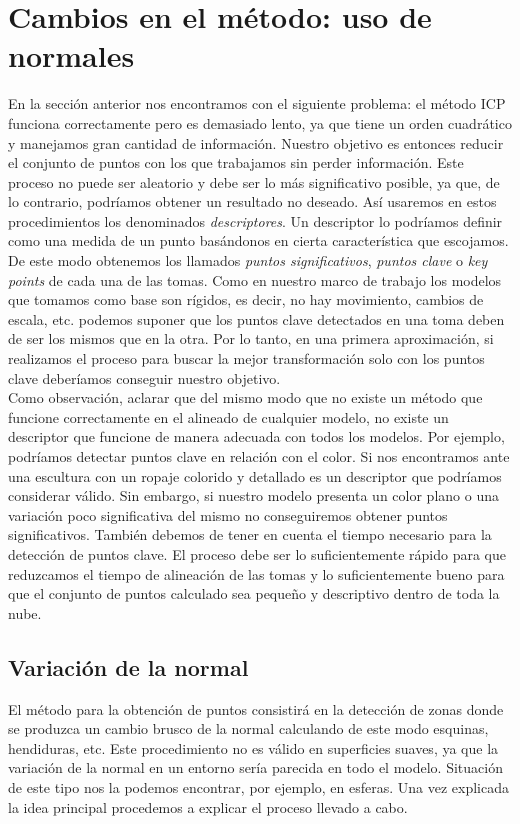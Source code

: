 \chapter{Cambios en el método: uso de normales}
En la sección anterior nos encontramos con el siguiente problema: el método ICP funciona correctamente pero es demasiado lento, ya que tiene un orden cuadrático y manejamos gran cantidad de información. Nuestro objetivo es entonces reducir el conjunto de puntos con los que trabajamos sin perder información. Este proceso no puede ser aleatorio y debe ser lo más significativo posible, ya que, de lo contrario, podríamos obtener un resultado no deseado. Así usaremos en estos procedimientos los denominados \textit{descriptores}. Un descriptor lo podríamos definir como una medida de un punto basándonos en cierta característica que escojamos. De este modo obtenemos los llamados \textit{puntos significativos}, \textit{puntos clave} o \textit{key points} de cada una de las tomas. Como en nuestro marco de trabajo los modelos que tomamos como base son rígidos, es decir, no hay movimiento, cambios de escala, etc. podemos suponer que los puntos clave detectados en una toma deben de ser los mismos que en la otra. Por lo tanto, en una primera aproximación,  si realizamos el proceso para buscar la mejor transformación solo con los puntos clave deberíamos conseguir nuestro objetivo. \\

Como observación, aclarar que del mismo modo que no existe un método que funcione correctamente en el alineado de cualquier modelo, no existe un descriptor que funcione de manera adecuada con todos los modelos. Por ejemplo, podríamos detectar puntos clave en relación con el color. Si nos encontramos ante una escultura con un ropaje colorido y detallado es un descriptor que podríamos considerar válido. Sin embargo, si nuestro modelo presenta un color plano o una variación poco significativa del mismo no conseguiremos obtener puntos significativos. También debemos de tener en cuenta el tiempo necesario para la detección de puntos clave. El proceso debe ser lo suficientemente rápido para que reduzcamos el tiempo de alineación de las tomas y lo suficientemente bueno para que el conjunto de puntos calculado sea pequeño y descriptivo dentro de toda la nube.

\section{Variación de la normal}\label{varNormal}
El método para la obtención de puntos consistirá en la detección de zonas donde se produzca un cambio brusco de la normal calculando de este modo esquinas, hendiduras, etc.  Este procedimiento no es válido en superficies suaves, ya que la variación de la normal en un entorno sería parecida en todo el modelo. Situación de este tipo nos la podemos encontrar, por ejemplo, en esferas. Una vez explicada la idea principal procedemos a explicar el proceso llevado a cabo. \\


